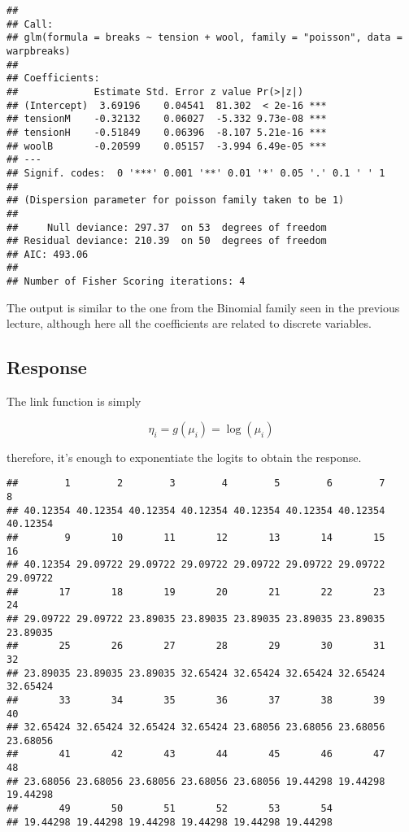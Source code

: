 \documentclass[
  oneside]{book}
\newenvironment{Shaded}{\begin{snugshade}}{\end{snugshade}}
\newcommand{\NormalTok}[1]{#1}
\newcommand{\SpecialCharTok}[1]{\textcolor[rgb]{0.00,0.00,0.00}{#1}}
\begin{document}
\begin{verbatim}
## 
## Call:
## glm(formula = breaks ~ tension + wool, family = "poisson", data = warpbreaks)
## 
## Coefficients:
##             Estimate Std. Error z value Pr(>|z|)    
## (Intercept)  3.69196    0.04541  81.302  < 2e-16 ***
## tensionM    -0.32132    0.06027  -5.332 9.73e-08 ***
## tensionH    -0.51849    0.06396  -8.107 5.21e-16 ***
## woolB       -0.20599    0.05157  -3.994 6.49e-05 ***
## ---
## Signif. codes:  0 '***' 0.001 '**' 0.01 '*' 0.05 '.' 0.1 ' ' 1
## 
## (Dispersion parameter for poisson family taken to be 1)
## 
##     Null deviance: 297.37  on 53  degrees of freedom
## Residual deviance: 210.39  on 50  degrees of freedom
## AIC: 493.06
## 
## Number of Fisher Scoring iterations: 4
\end{verbatim}

The output is similar to the one from the Binomial family seen
in the previous lecture, although here all the coefficients are
related to discrete variables.

\hypertarget{response}{%
\subsection{Response}\label{response}}

The link function is simply

\[
\eta_i = g(\mu_i) = \log(\mu_i)
\]

therefore, it's enough to exponentiate the logits to obtain
the response.

\begin{Shaded}
\end{Shaded}

\begin{verbatim}
##        1        2        3        4        5        6        7        8 
## 40.12354 40.12354 40.12354 40.12354 40.12354 40.12354 40.12354 40.12354 
##        9       10       11       12       13       14       15       16 
## 40.12354 29.09722 29.09722 29.09722 29.09722 29.09722 29.09722 29.09722 
##       17       18       19       20       21       22       23       24 
## 29.09722 29.09722 23.89035 23.89035 23.89035 23.89035 23.89035 23.89035 
##       25       26       27       28       29       30       31       32 
## 23.89035 23.89035 23.89035 32.65424 32.65424 32.65424 32.65424 32.65424 
##       33       34       35       36       37       38       39       40 
## 32.65424 32.65424 32.65424 32.65424 23.68056 23.68056 23.68056 23.68056 
##       41       42       43       44       45       46       47       48 
## 23.68056 23.68056 23.68056 23.68056 23.68056 19.44298 19.44298 19.44298 
##       49       50       51       52       53       54 
## 19.44298 19.44298 19.44298 19.44298 19.44298 19.44298
\end{verbatim}
\end{document}
